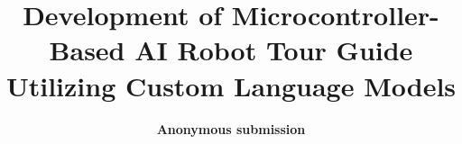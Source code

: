 \documentclass[conference]{IEEEtran}
\makeatletter
\newcommand{\linebreakand}{%
    \end{@IEEEauthorhalign}
    \hfill\mbox{}\par
    \mbox{}\hfill\begin{@IEEEauthorhalign}
}
\makeatother
\begin{document}
\title{Development of Microcontroller-Based AI Robot Tour Guide Utilizing Custom Language Models
}






            


\author{\textbf{Anonymous submission}}

\maketitle
\thispagestyle{plain}
\pagestyle{plain}
\end{document}
